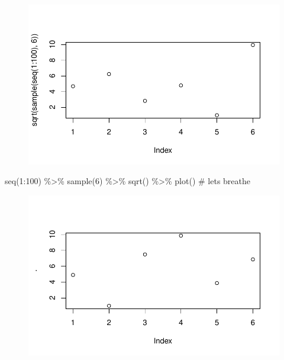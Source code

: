 \documentclass[
  letterpaper,
  DIV=11,
  numbers=noendperiod]{scrreprt}
\newenvironment{Shaded}{\begin{snugshade}}{\end{snugshade}}
\newcommand{\CommentTok}[1]{\textcolor[rgb]{0.37,0.37,0.37}{#1}}
\newcommand{\DecValTok}[1]{\textcolor[rgb]{0.68,0.00,0.00}{#1}}
\newcommand{\FunctionTok}[1]{\textcolor[rgb]{0.28,0.35,0.67}{#1}}
\newcommand{\NormalTok}[1]{\textcolor[rgb]{0.00,0.23,0.31}{#1}}
\newcommand{\SpecialCharTok}[1]{\textcolor[rgb]{0.37,0.37,0.37}{#1}}
\begin{document}
\begin{figure}[H]

{\centering \includegraphics{premiers-pas_files/figure-pdf/unnamed-chunk-65-1.pdf}

}

\end{figure}

\begin{Shaded}
\begin{Highlighting}[]
\FunctionTok{seq}\NormalTok{(}\DecValTok{1}\SpecialCharTok{:}\DecValTok{100}\NormalTok{) }\SpecialCharTok{\%\textgreater{}\%} \FunctionTok{sample}\NormalTok{(}\DecValTok{6}\NormalTok{) }\SpecialCharTok{\%\textgreater{}\%} \FunctionTok{sqrt}\NormalTok{() }\SpecialCharTok{\%\textgreater{}\%} \FunctionTok{plot}\NormalTok{() }\CommentTok{\# let\textquotesingle{}s breathe}
\end{Highlighting}
\end{Shaded}

\begin{figure}[H]

{\centering \includegraphics{premiers-pas_files/figure-pdf/unnamed-chunk-65-2.pdf}

}

\end{figure}
\end{document}
